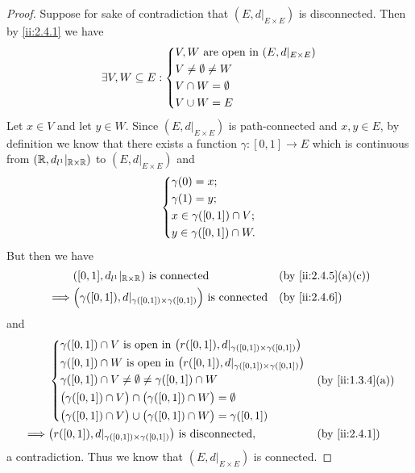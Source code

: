 \begin{proof}
  Suppose for sake of contradiction that \((E, d|_{E \times E})\) is disconnected.
  Then by \cref{ii:2.4.1} we have
  \[
    \exists V, W \subseteq E : \begin{dcases}
      V, W \text{ are open in } (E, d|_{E \times E}) \\
      V \neq \emptyset \neq W                        \\
      V \cap W = \emptyset                           \\
      V \cup W = E
    \end{dcases}
  \]
  Let \(x \in V\) and let \(y \in W\).
  Since \((E, d|_{E \times E})\) is path-connected and \(x, y \in E\), by definition we know that there exists a function \(\gamma : [0, 1] \to E\) which is continuous from \((\mathbb{R}, d_{l^1}|_{\mathbb{R} \times \mathbb{R}})\) to \((E, d|_{E \times E})\) and
  \[
    \begin{dcases}
      \gamma(0) = x;               \\
      \gamma(1) = y;               \\
      x \in \gamma([0, 1]) \cap V; \\
      y \in \gamma([0, 1]) \cap W.
    \end{dcases}
  \]
  But then we have
  \begin{align*}
             & ([0, 1], d_{l^1}|_{\R \times \R}) \text{ is connected}                                   &  & \by{ii:2.4.5}[a,c] \\
    \implies & \Big(\gamma([0, 1]), d|_{\gamma([0, 1]) \times \gamma([0, 1])}\Big) \text{ is connected} &  & \by{ii:2.4.6}
  \end{align*}
  and
  \begin{align*}
             & \begin{dcases}
                 \gamma([0, 1]) \cap V \text{ is open in } \big(r([0, 1]), d|_{\gamma([0, 1]) \times \gamma([0, 1])}\big) \\
                 \gamma([0, 1]) \cap W \text{ is open in } \big(r([0, 1]), d|_{\gamma([0, 1]) \times \gamma([0, 1])}\big) \\
                 \gamma([0, 1]) \cap V \neq \emptyset \neq \gamma([0, 1]) \cap W                                          \\
                 \big(\gamma([0, 1]) \cap V\big) \cap \big(\gamma([0, 1]) \cap W\big) = \emptyset                         \\
                 \big(\gamma([0, 1]) \cap V\big) \cup \big(\gamma([0, 1]) \cap W\big) = \gamma([0, 1])
               \end{dcases} &  & \by{ii:1.3.4}[a]                       \\
    \implies & \big(r([0, 1]), d|_{\gamma([0, 1]) \times \gamma([0, 1])}\big) \text{ is disconnected},                                     &  & \by{ii:2.4.1}
  \end{align*}
  a contradiction.
  Thus we know that \((E, d|_{E \times E})\) is connected.
\end{proof}


